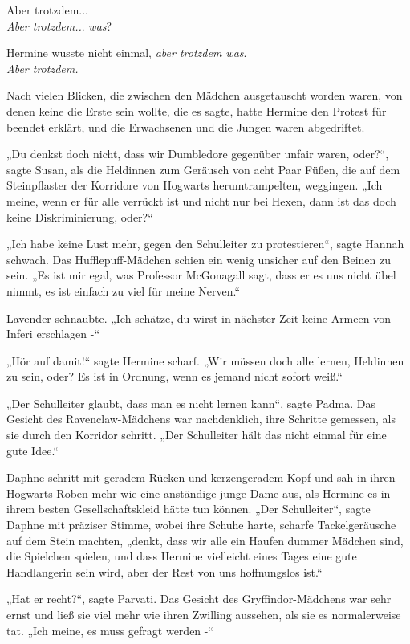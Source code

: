 {Aber trotzdem...\\ \emph{Aber trotzdem..}. \emph{was}?

Hermine wusste nicht einmal, \emph{aber trotzdem was}.\\ \emph{Aber trotzdem.}

Nach vielen Blicken, die zwischen den Mädchen ausgetauscht worden waren, von denen keine die Erste sein wollte, die es sagte, hatte Hermine den Protest für beendet erklärt, und die Erwachsenen und die Jungen waren abgedriftet.

„Du denkst doch nicht, dass wir Dumbledore gegenüber unfair waren, oder?“, sagte Susan, als die Heldinnen zum Geräusch von acht Paar Füßen, die auf dem Steinpflaster der Korridore von Hogwarts herumtrampelten, weggingen. „Ich meine, wenn er für alle verrückt ist und nicht nur bei Hexen, dann ist das doch keine Diskriminierung, oder?“

„Ich habe keine Lust mehr, gegen den Schulleiter zu protestieren“, sagte Hannah schwach. Das Hufflepuff-Mädchen schien ein wenig unsicher auf den Beinen zu sein. „Es ist mir egal, was Professor McGonagall sagt, dass er es uns nicht übel nimmt, es ist einfach zu viel für meine Nerven.“

Lavender schnaubte. „Ich schätze, du wirst in nächster Zeit keine Armeen von Inferi erschlagen -“

„Hör auf damit!“ sagte Hermine scharf. „Wir müssen doch alle lernen, Heldinnen zu sein, oder? Es ist in Ordnung, wenn es jemand nicht sofort weiß.“

„Der Schulleiter glaubt, dass man es nicht lernen kann“, sagte Padma. Das Gesicht des Ravenclaw-Mädchens war nachdenklich, ihre Schritte gemessen, als sie durch den Korridor schritt. „Der Schulleiter hält das nicht einmal für eine gute Idee.“

Daphne schritt mit geradem Rücken und kerzengeradem Kopf und sah in ihren Hogwarts-Roben mehr wie eine anständige junge Dame aus, als Hermine es in ihrem besten Gesellschaftskleid hätte tun können. „Der Schulleiter“, sagte Daphne mit präziser Stimme, wobei ihre Schuhe harte, scharfe Tackelgeräusche auf dem Stein machten, „denkt, dass wir alle ein Haufen dummer Mädchen sind, die Spielchen spielen, und dass Hermine vielleicht eines Tages eine gute Handlangerin sein wird, aber der Rest von uns hoffnungslos ist.“

„Hat er recht?“, sagte Parvati. Das Gesicht des Gryffindor-Mädchens war sehr ernst und ließ sie viel mehr wie ihren Zwilling aussehen, als sie es normalerweise tat. „Ich meine, es muss gefragt werden -“

}
